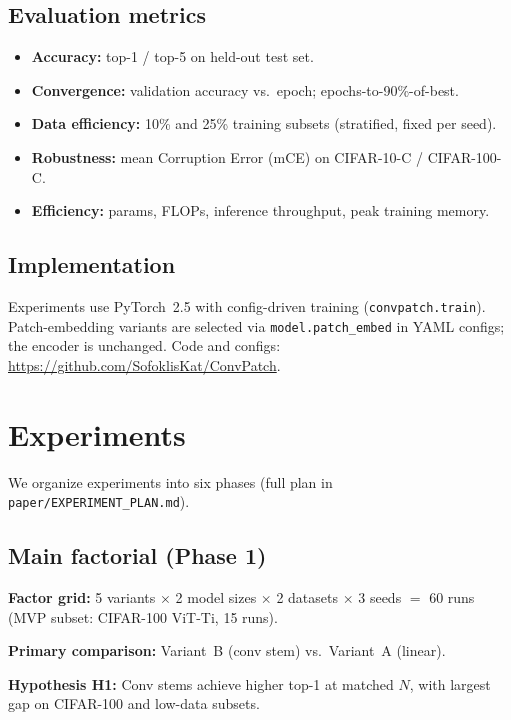 \documentclass[10pt,twocolumn]{article}
\begin{document}
\subsection{Evaluation metrics}

\begin{itemize}
  \item \textbf{Accuracy:} top-1 / top-5 on held-out test set.
  \item \textbf{Convergence:} validation accuracy vs.\ epoch; epochs-to-90\%-of-best.
  \item \textbf{Data efficiency:} 10\% and 25\% training subsets (stratified, fixed per seed).
  \item \textbf{Robustness:} mean Corruption Error (mCE) on CIFAR-10-C / CIFAR-100-C.
  \item \textbf{Efficiency:} params, FLOPs, inference throughput, peak training memory.
\end{itemize}

\subsection{Implementation}

Experiments use PyTorch~2.5 with config-driven training (\texttt{convpatch.train}).
Patch-embedding variants are selected via \texttt{model.patch\_embed} in YAML configs; the encoder is unchanged.
Code and configs: \url{https://github.com/SofoklisKat/ConvPatch}.

\section{Experiments}
\label{sec:experiments}

We organize experiments into six phases (full plan in \texttt{paper/EXPERIMENT\_PLAN.md}).

\subsection{Main factorial (Phase 1)}

\textbf{Factor grid:} 5 variants $\times$ 2 model sizes $\times$ 2 datasets $\times$ 3 seeds $=$ 60 runs (MVP subset: CIFAR-100 ViT-Ti, 15 runs).

\textbf{Primary comparison:} Variant~B (conv stem) vs.\ Variant~A (linear).

\textbf{Hypothesis H1:} Conv stems achieve higher top-1 at matched $N$, with largest gap on CIFAR-100 and low-data subsets.
\end{document}
